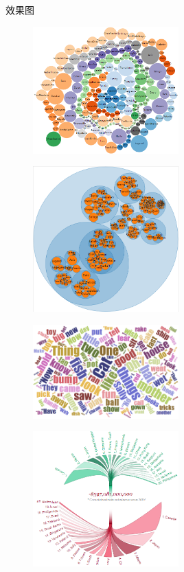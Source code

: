 \begin{frame}{效果图}
\begin{figure}
    \includegraphics[width=0.5\textwidth]{figure/d3.demo1.png}
\end{figure}

\newpage
\begin{figure}
    \includegraphics[width=0.5\textwidth]{figure/d3.demo2.png}
\end{figure}
\newpage
\begin{figure}
    \includegraphics[width=0.5\textwidth]{figure/d3.demo3.png}
\end{figure}
\newpage
\begin{figure}
    \includegraphics[width=0.5\textwidth]{figure/d3.demo4.png}
\end{figure}
\end{frame}


